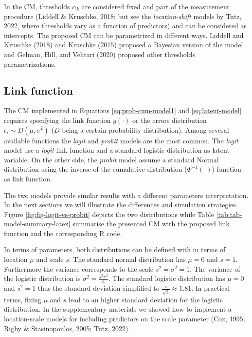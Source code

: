 \documentclass[
  man,floatsintext]{apa6}
\begin{document}
In the CM, thresholds \(\alpha_k\) are considered fixed and part of the measurement procedure (Liddell \& Kruschke, 2018; but see the \emph{location-shift} models by Tutz, 2022, where thresholds vary as a function of predictors) and can be considered as intercepts. The proposed CM can be parametrized in different ways. Liddell and Kruschke (2018) and Kruschke (2015) proposed a Bayesian version of the model and Gelman, Hill, and Vehtari (2020) proposed other thresholds parametrizations.

\subsection{Link function}\label{link-function}

The CM implemented in Equations \eqref{eq:prob-cum-model1} and \eqref{eq:latent-model} requires specifying the link function \(g(\cdot)\) or the errors distribution \(\epsilon_i \sim D(\mu, \sigma^2)\) (\(D\) being a certain probability distribution). Among several available functions the \emph{logit} and \emph{probit} models are the most common. The \emph{logit} model use a \emph{logit} link function and a standard logistic distribution as latent variable. On the other side, the \emph{probit} model assume a standard Normal distribution using the inverse of the cumulative distribution (\(\Phi^{-1}(\cdot)\)) function as link function.

The two models provide similar results with a different parameters interpretation. In the next sections we will illustrate the differences and simulation strategies. Figure \ref{fig:fig-logit-vs-probit} depicts the two distributions while Table \ref{tab:tab-model-summary-latex} summarise the presented CM with the proposed link function and the corresponding R code.

In terms of parameters, both distributions can be defined with in terms of location \(\mu\) and scale \(s\). The standard normal distribution has \(\mu = 0\) and \(s = 1\). Furthermore the variance corresponds to the scale \(s^2 = \sigma^2 = 1\). The variance of the logistic distribution is \(\sigma^2 = \frac{s^2\pi^2}{3}\). The standard logistic distribution has \(\mu = 0\) and \(s^2 = 1\) thus the standard deviation simplified to \(\frac{\pi}{\sqrt{3}} \approx 1.81\). In practical terms, fixing \(\mu\) and \(s\) lead to an higher standard deviation for the logistic distribution. In the supplementary materials we showed how to implement a location-scale models for including predictors on the scale parameter (Cox, 1995; Rigby \& Stasinopoulos, 2005; Tutz, 2022).
\end{document}
